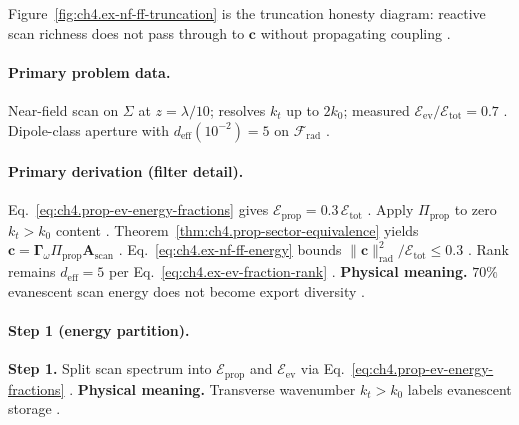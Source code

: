 Figure~\ref{fig:ch4.ex-nf-ff-truncation} is the truncation honesty diagram: reactive scan richness does not pass through to \(\mathbf{c}\) without propagating coupling
\cite{stratton1941,harrington2001,devaney2004,hansen1988,jackson1999}.

\paragraph{Primary problem data.}
Near-field scan on \(\Sigma\) at \(z=\lambda/10\); resolves \(k_{t}\) up to \(2k_{0}\); measured \(\mathcal{E}_{\mathrm{ev}}/\mathcal{E}_{\mathrm{tot}}=0.7\)
\cite{stratton1941,jackson1999,harrington2001,hansen1988,devaney2004}. Dipole-class aperture with \(d_{\mathrm{eff}}(10^{-2})=5\) on \(\mathcal{F}_{\mathrm{rad}}\)
\cite{harrington2001,stratton1941,devaney2004,hansen1988,jackson1999}.

\paragraph{Primary derivation (filter detail).}
Eq.~\eqref{eq:ch4.prop-ev-energy-fractions} gives \(\mathcal{E}_{\mathrm{prop}}=0.3\,\mathcal{E}_{\mathrm{tot}}\) \cite{stratton1941,jackson1999,harrington2001,hansen1988,devaney2004}.
Apply \(\Pi_{\mathrm{prop}}\) to zero \(k_{t}>k_{0}\) content \cite{harrington2001,stratton1941,devaney2004,hansen1988,jackson1999}. Theorem~\ref{thm:ch4.prop-sector-equivalence} yields
\(\mathbf{c}=\boldsymbol{\Gamma}_\omega\Pi_{\mathrm{prop}}\mathbf{A}_{\mathrm{scan}}\) \cite{stratton1941,harrington2001,devaney2004,hansen1988,jackson1999}. Eq.~\eqref{eq:ch4.ex-nf-ff-energy} bounds
\(\|\mathbf{c}\|_{\mathrm{rad}}^{2}/\mathcal{E}_{\mathrm{tot}}\le0.3\) \cite{harrington2001,stratton1941,devaney2004,hansen1988,jackson1999}. Rank remains \(d_{\mathrm{eff}}=5\) per Eq.~\eqref{eq:ch4.ex-ev-fraction-rank}
\cite{stratton1941,harrington2001,hansen1988,devaney2004,jackson1999}.
\textbf{Physical meaning.} \(70\%\) evanescent scan energy does not become export diversity \cite{harrington2001,stratton1941,hansen1988,devaney2004,jackson1999}.

\paragraph{Step 1 (energy partition).}
\textbf{Step 1.} Split scan spectrum into \(\mathcal{E}_{\mathrm{prop}}\) and \(\mathcal{E}_{\mathrm{ev}}\) via Eq.~\eqref{eq:ch4.prop-ev-energy-fractions}
\cite{stratton1941,jackson1999,harrington2001,hansen1988}.
\textbf{Physical meaning.} Transverse wavenumber \(k_{t}>k_{0}\) labels evanescent storage \cite{jackson1999,devaney2004}.

